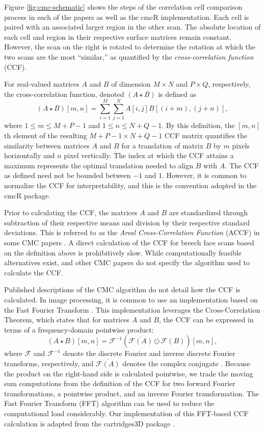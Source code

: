 \documentclass[11pt,]{isuthesis}
\begin{document}
Figure \ref{fig:cmc-schematic} shows the steps of the correlation cell comparison process in each of the papers as well as the cmcR implementation.
Each cell is paired with an associated larger region in the other scan.
The absolute location of each cell and region in their respective surface matrices remain constant.
However, the scan on the right is rotated to determine the rotation at which the two scans are the most ``similar,'' as quantified by the \emph{cross-correlation function} (CCF).

For real-valued matrices \(A\) and \(B\) of dimension \(M \times N\) and \(P \times Q\), respectively, the cross-correlation function, denoted \((A \star B)\) is defined as
\[
(A \star B)[m,n] = \sum_{i=1}^M \sum_{j=1}^N A[i,j] B[(i + m), (j + n)],
\] where \(1 \leq m \leq M + P - 1\) and \(1 \leq n \leq N + Q - 1\).
By this definition, the \([m,n]\)th element of the resulting \(M + P - 1 \times N + Q - 1\) CCF matrix quantifies the similarity between matrices \(A\) and \(B\) for a translation of matrix \(B\) by \(m\) pixels horizontally and \(n\) pixel vertically.
The index at which the CCF attains a maximum represents the optimal translation needed to align \(B\) with \(A\).
The CCF as defined need not be bounded between \(-1\) and \(1\).
However, it is common to normalize the CCF for interpretability, and this is the convention adopted in the cmcR package.

Prior to calculating the CCF, the matrices \(A\) and \(B\) are standardized through subtraction of their respective means and division by their respective standard deviations.
This is referred to as the \emph{Areal Cross-Correlation Function} (ACCF) in some CMC papers \citep{ott_applying_2017}.
A direct calculation of the CCF for breech face scans based on the definition above is prohibitively slow.
While computationally feasible alternatives exist, \citet{song_proposed_2013} and other CMC papers do not specify the algorithm used to calculate the CCF.

Published descriptions of the CMC algorithm do not detail how the CCF is calculated.
In image processing, it is common to use an implementation based on the Fast Fourier Transform \citep{Brown1992}.
This implementation leverages the Cross-Correlation Theorem, which states that for matrices \(A\) and \(B\), the CCF can be expressed in terms of a frequency-domain pointwise product:
\[
(A \star B )[m,n]= \mathcal{F}^{-1}\left(\overline{\mathcal{F}(A)} \odot \mathcal{F}(B)\right)[m,n],
\]
where \(\mathcal{F}\) and \(\mathcal{F}^{-1}\) denote the discrete Fourier and inverse discrete Fourier transforms, respectively, and \(\overline{\mathcal{F}(A)}\) denotes the complex conjugate \citep{fft_brigham}.
Because the product on the right-hand side is calculated pointwise, we trade the moving sum computations from the definition of the CCF for two forward Fourier transformations, a pointwise product, and an inverse Fourier transformation.
The Fast Fourier Transform (FFT) algorithm can be used to reduce the computational load considerably.
Our implementation of this FFT-based CCF calculation is adapted from the cartridges3D package \citep{cartridges3D}.
\end{document}
